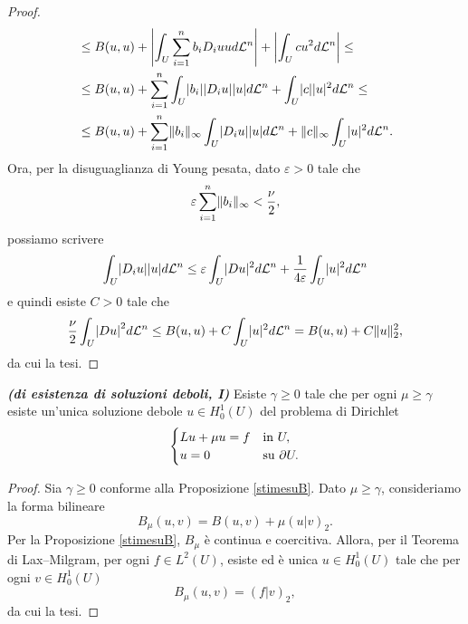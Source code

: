 \begin{proposizione}
\begin{proof}
\begin{align*}
			&\le B(u,u) + \abs*{\int_U\sum_{i=1}^n b_iD_iu ud\mathcal{L}^n} + \abs*{\int_Ucu^2 d\mathcal{L}^n} \le \\
			&\le B(u,u) + \sum_{i=1}^n \int_U \abs{b_i}\abs{D_iu}\abs{u}d\mathcal{L}^n + \int_U \abs{c}\abs{u}^2d\mathcal{L}^n \le \\
			&\le B(u,u) +  \sum_{i=1}^n  \norm{b_i}_\infty\int_U \abs{D_iu}\abs{u}d\mathcal{L}^n +  \norm{c}_\infty\int_U \abs{u}^2d\mathcal{L}^n.
		\end{align*}
		Ora, per la disuguaglianza di Young pesata, dato $\varepsilon > 0 $ tale che
		\[ \varepsilon \sum_{i=1}^n  \norm{b_i}_\infty < \frac{\nu}{2},\]
		possiamo scrivere
		\[ \int_U \abs{D_iu}\abs{u}d\mathcal{L}^n \le \varepsilon \int_U\abs{Du}^2d\mathcal{L}^n + \frac{1}{4\varepsilon}\int_U\abs{u}^2d\mathcal{L}^n \]
		e quindi esiste $C > 0$ tale che
		\[ \frac{\nu}{2} \int_U \abs*{Du}^2 d\mathcal{L}^n \le B(u,u) + C\int_U\abs{u}^2d\mathcal{L}^n = B(u,u) + C\norm{u}_2^2,\]
		da cui la tesi.
	\end{proof}
\end{proposizione}
\begin{teorema}\emph{\textbf{(di esistenza di soluzioni deboli, I)}}
	Esiste $\gamma \ge 0$ tale che per ogni $\mu \ge \gamma$ esiste un'unica soluzione debole $u \in H^1_0(U)$ del problema di Dirichlet
	\[ \begin{cases}
		Lu + \mu u = f& \textup{in } U,\\
		u = 0 & \textup{su } \partial U.
	\end{cases} \]
\end{teorema}
\begin{proof}
	Sia $\gamma \ge 0$ conforme alla Proposizione \eqref{stimesuB}. Dato $\mu \ge \gamma$, consideriamo la forma bilineare
	\[ B_\mu(u,v) = B(u,v) + \mu(u|v)_2.  \]
	Per la Proposizione \eqref{stimesuB}, $B_\mu$ è continua e coercitiva. Allora, per il Teorema di Lax--Milgram, per ogni $f \in L^2(U)$, esiste ed è unica $u \in H^1_0(U)$ tale che per ogni $v \in H^1_0(U)$
	\[ B_\mu(u,v) = (f|v)_2, \]
	da cui la tesi.
\end{proof}

